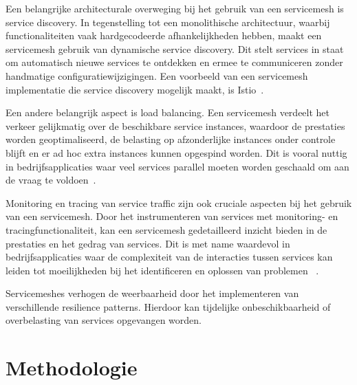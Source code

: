 Een belangrijke architecturale overweging bij het gebruik van een servicemesh is service discovery. In tegenstelling tot een monolithische architectuur, waarbij functionaliteiten vaak hardgecodeerde afhankelijkheden hebben, maakt een servicemesh gebruik van dynamische service discovery. Dit stelt services in staat om automatisch nieuwe services te ontdekken en ermee te communiceren zonder handmatige configuratiewijzigingen. Een voorbeeld van een servicemesh implementatie die service discovery mogelijk maakt, is Istio\linebreak~\autocite{Morgan2021}.

Een andere belangrijk aspect is load balancing. Een servicemesh verdeelt het verkeer gelijkmatig over de beschikbare service instances, waardoor de prestaties worden geoptimaliseerd, de belasting op afzonderlijke instances onder controle blijft en er ad hoc extra instances kunnen opgespind worden. Dit is vooral nuttig in bedrijfsapplicaties waar veel services parallel moeten worden geschaald om aan de vraag te voldoen~\autocite{Ciobotaru2020}.

Monitoring en tracing van service traffic zijn ook cruciale aspecten bij het gebruik van een servicemesh. Door het instrumenteren van services met monitoring- en tracingfunctionaliteit, kan een servicemesh gedetailleerd inzicht bieden in de prestaties en het gedrag van services. Dit is met name waardevol in bedrijfsapplicaties waar de complexiteit van de interacties tussen services kan leiden tot moeilijkheden bij het identificeren en oplossen van problemen \linebreak ~\autocite{Ciobotaru2021}.

Servicemeshes verhogen de weerbaarheid door het implementeren van verschillende resilience patterns. Hierdoor kan tijdelijke onbeschikbaarheid of overbelasting van services opgevangen worden.



\section{Methodologie}%
\label{sec:methodologie}

